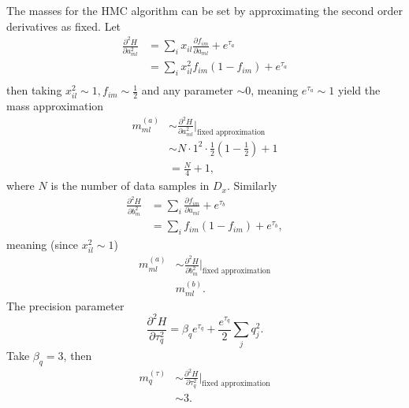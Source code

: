 \begin{example}
	The masses for the HMC algorithm can be set by approximating the second order derivatives as fixed. Let
	\begin{equation}
		\begin{split}
			\frac{\partial^2 H}{\partial a_{ml}^2} &= \sum_ix_{il}\frac{\partial f_{im}}{\partial a_{ml}}+e^{\tau_a}\\
			& =\sum_ix_{il}^2f_{im}( 1- f_{im})+e^{\tau_a}\\
		\end{split}
	\end{equation}
	then taking $x_{il}^2\sim 1, f_{im}\sim \frac{1}{2}$ and any parameter $\sim 0$, meaning $e^{\tau_a} \sim 1$ yield the mass approximation
	\begin{equation}
		\begin{split}
			m_{ml}^{(a)} &\sim \frac{\partial^2 H}{\partial a_{ml}^2}\bigg|_{\text{fixed approximation}}\\
			& \sim N\cdot 1^2\cdot \frac{1}{2}(1-\frac{1}{2})+1\\
			&=\frac{N}{4} +1,
		\end{split}
	\end{equation}
	where $N$ is the number of data samples in $D_x$. Similarly
	\begin{equation}
		\begin{split}
			\frac{\partial^2 H}{\partial b_m^2} &= \sum_i\frac{\partial f_{im}}{\partial a_{ml}}+e^{\tau_b}\\
			& =\sum_if_{im}( 1- f_{im})+e^{\tau_b},
		\end{split}
	\end{equation}
	meaning (since $x_{il}^2\sim 1$)
	\begin{equation}
		\begin{split}
			m_{ml}^{(a)} &\sim \frac{\partial^2 H}{\partial b_{m}^2}\bigg|_{\text{fixed approximation}}\\
			& m_{ml}^{(b)}.
		\end{split}
	\end{equation}
	The precision parameter
	\begin{equation}
		\frac{\partial^2 H}{\partial \tau_q^2} = \beta_qe^{\tau_q}+\frac{e^{\tau_q}}{2}\sum_jq_j^2.
	\end{equation}
	Take $\beta_q = 3$, then
	\begin{equation}
		\begin{split}
			m_{q}^{(\tau)} &\sim \frac{\partial^2 H}{\partial \tau_{q}^2}\bigg|_{\text{fixed approximation}}\\
			&\sim 3.
		\end{split}
	\end{equation}
	

\end{example}
